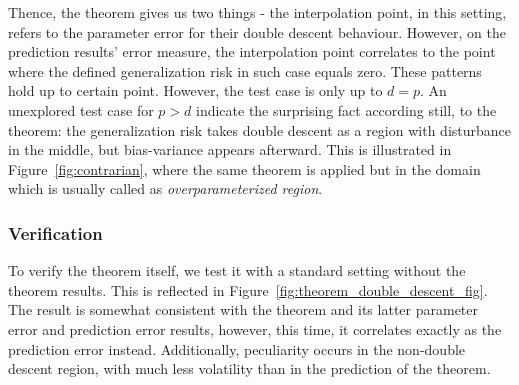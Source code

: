 \documentclass[10pt]{article}
\begin{document}
Thence, the theorem gives us two things - the interpolation point, in this setting, refers to the parameter error for their double descent behaviour. However, on the prediction results' error measure, the interpolation point correlates to the point where the defined generalization risk in such case equals zero. These patterns hold up to certain point. However, the test case is only up to $d=p$. An unexplored test case for $p>d$ indicate the surprising fact according still, to the theorem: the generalization risk takes double descent as a region with disturbance in the middle, but bias-variance appears afterward. This is illustrated in Figure~\ref{fig:contrarian}, where the same theorem is applied but in the domain which is usually called as \textit{overparameterized region}. 

\subsubsection{Verification}

To verify the theorem itself, we test it with a standard setting without the theorem results. This is reflected in Figure~\ref{fig:theorem_double_descent_fig}. The result is somewhat consistent with the theorem and its latter parameter error and prediction error results, however, this time, it correlates exactly as the prediction error instead. Additionally, peculiarity occurs in the non-double descent region, with much less volatility than in the prediction of the theorem. 
\end{document}
